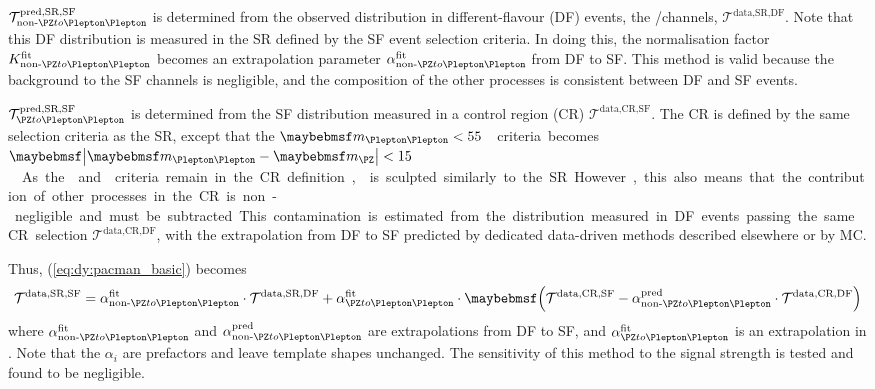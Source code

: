 $\mathcal{T}^{\text{pred,SR,SF}}_{\text{non-}\HepProcess{\PZ\HepTo\Plepton\Plepton}}$ 
is determined from the observed distribution in different-flavour (DF) events, \ie the 
\emch/\mech channels, $\mathcal{T}^{\text{data,SR,DF}}$. Note that this DF distribution 
is measured in the SR defined by the SF event selection criteria. In doing this, the 
normalisation factor $K^{\text{fit}}_{\text{non-}\HepProcess{\PZ\HepTo\Plepton\Plepton}}$ 
becomes an extrapolation parameter 
$\alpha_{\text{non-}\HepProcess{\PZ\HepTo\Plepton\Plepton}}^{\text{fit}}$ from DF to SF. 
This method is valid because the \DYll background to the SF channels is negligible, and 
the composition of the other processes is consistent between DF and SF events.

$\mathcal{T}^{\text{pred,SR,SF}}_{\HepProcess{\PZ\HepTo\Plepton\Plepton}}$ is determined 
from the SF distribution measured in a \DYll control region (CR) 
$\mathcal{T}^{\text{data,CR,SF}}$. The CR is defined by the same selection criteria as 
the SR, except that the \unit{$\mll < 55$}{\GeV} criteria becomes 
\unit{$\mods{\mll - \mZ} < 15$}{\GeV}. As the \met and \ptll criteria remain in the CR 
definition, \frecoil is sculpted similarly to the SR. However, this also means that the 
contribution of other processes in the CR is non-negligible and must be subtracted. This 
contamination is estimated from the distribution measured in DF events passing the same 
CR selection $\mathcal{T}^{\text{data,CR,DF}}$, with the extrapolation from DF to SF 
predicted by dedicated data-driven methods described elsewhere or by MC.

Thus, (\ref{eq:dy:pacman_basic}) becomes
\begin{equation}
	\mathcal{T}^{\text{data,SR,SF}} = \alpha_{\text{non-}\HepProcess{\PZ\HepTo\Plepton\Plepton}}^{\text{fit}} \cdot \mathcal{T}^{\text{data,SR,DF}} + \alpha_{\HepProcess{\PZ\HepTo\Plepton\Plepton}}^{\text{fit}} \cdot \parenths{\mathcal{T}^{\text{data,CR,SF}} - \alpha_{\text{non-}\HepProcess{\PZ\HepTo\Plepton\Plepton}}^{\text{pred}} \cdot \mathcal{T}^{\text{data,CR,DF}}}
	\label{eq:dy:pacman_full}
\end{equation}
where $\alpha_{\text{non-}\HepProcess{\PZ\HepTo\Plepton\Plepton}}^{\text{fit}}$ and 
$\alpha_{\text{non-}\HepProcess{\PZ\HepTo\Plepton\Plepton}}^{\text{pred}}$ are 
extrapolations from DF to SF, and 
$\alpha_{\HepProcess{\PZ\HepTo\Plepton\Plepton}}^{\text{fit}}$ is an extrapolation in 
\mll. Note that the $\alpha_i$ are prefactors and leave template shapes unchanged. The 
sensitivity of this method to the signal strength is tested and found to be negligible. 

